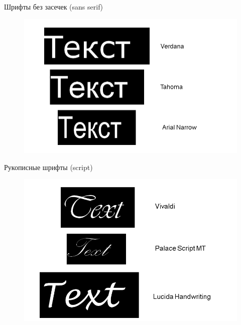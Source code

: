 \documentclass{beamer}
\begin{document}
\begin{frame}[t]{Шрифты без засечек (sans serif)}
	\begin{figure}[h]
		\centering
		\includegraphics[scale=0.5]{images/lec05-pic08.png}
	\end{figure}
\end{frame}  

\begin{frame}[t]{Рукописные шрифты (script)}
	\begin{figure}[h]
		\centering
		\includegraphics[scale=0.5]{images/lec05-pic09.png}
	\end{figure}
\end{frame}  
\end{document}

